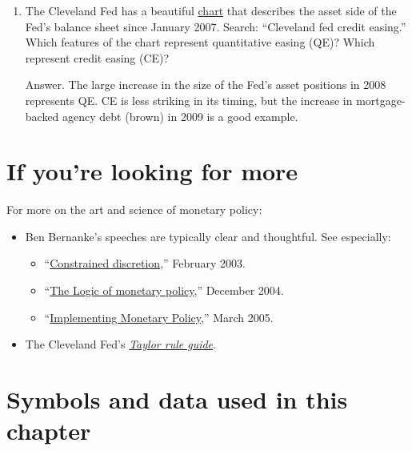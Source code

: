 \begin{enumerate}
\item The Cleveland Fed has a beautiful
\href{http://www.clevelandfed.org/research/data/credit_easing/index.cfm}{chart}
that describes the asset side of the Fed's balance sheet since January 2007.
Search:  ``Cleveland fed credit easing.''
Which features of the chart represent quantitative easing (QE)?
Which represent credit easing (CE)?

Answer.
The large increase in the size of the Fed's asset positions in 2008
represents QE.
CE is less striking in its timing, but the increase in mortgage-backed
agency debt (brown) in 2009 is a good example.

\end{enumerate}
\setlength{\leftmargini}{\oldleftmargini}

\section*{If you're looking for more}

For more on the art and science of monetary policy:
%
\begin{itemize}
\item Ben Bernanke's speeches are typically clear and thoughtful.
See especially:
\begin{itemize}
\item
``\href{http://www.federalreserve.gov/boarddocs/speeches/2003/20030203/default.htm}
{Constrained discretion},'' February 2003.

\item ``\href{http://www.federalreserve.gov/boarddocs/Speeches/2004/20041202/default.htm}
{The Logic of monetary policy},'' December 2004.

\item
``\href{http://www.federalreserve.gov/BoardDocs/Speeches/2005/20050330/default.htm}
{Implementing Monetary Policy},''
March 2005.

\end{itemize}
\item The Cleveland Fed's
\href{http://www.clevelandfed.org/Research/Com2003/0703.pdf}
{\it Taylor rule guide\/}.

\end{itemize}

\section*{Symbols and data used in this chapter}

